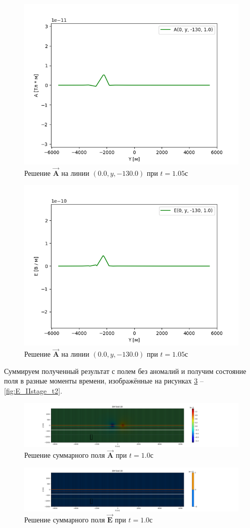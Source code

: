 \begin{figure}
	\centering
	\includegraphics[width=0.5\linewidth]{images/Normal_A_obj2_3.png}
	\caption{Решение $\overrightarrow{\textbf{A}}$ на линии $(0.0, y, -130.0)$  при $t = 1.05с$}
	\label{fig:A_2line_t2}
\end{figure} 

\begin{figure}
	\centering
	\includegraphics[width=0.5\linewidth]{images/Normal_E_obj2_2.png}
	\caption{Решение $\overrightarrow{\textbf{A}}$ на линии $(0.0, y, -130.0)$  при $t = 1.05с$}
	\label{fig:E_2line_t2}
\end{figure} 

Суммируем полученный результат с полем без аномалий и получим состояние поля в разные моменты времени, изображённые на рисунках \ref{fig:A_IIstage_t0} -- \ref{fig:E_IIstage_t2}.

\begin{figure}
	\centering
	\includegraphics[width=1.0\linewidth]{images/Answer_A_IIstage_time_layer_1.png}
	\caption{Решение суммарного поля $\overrightarrow{\textbf{A}}$ при $t = 1.0с$}
	\label{fig:A_IIstage_t0}
\end{figure} 


\begin{figure}
	\centering
	\includegraphics[width=1.0\linewidth]{images/Answer_E_IIstage_time_layer_1.png}
	\caption{Решение суммарного поля $\overrightarrow{\textbf{E}}$ при $t = 1.0с$}
	\label{fig:E_IIstage_t0}
\end{figure} 


